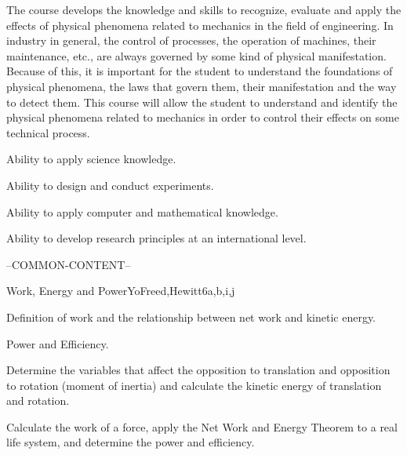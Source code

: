 \begin{syllabus}


\begin{justification}
   The course develops the knowledge and skills to recognize, evaluate and apply the effects of physical phenomena related to mechanics in the field of engineering. In industry in general, the control of processes, the operation of machines, their maintenance, etc., are always governed by some kind of physical manifestation. Because of this, it is important for the student to understand the foundations of physical phenomena, the laws that govern them, their manifestation and the way to detect them. This course will allow the student to understand and identify the physical phenomena related to mechanics in order to control their effects on some technical process. 
\end{justification}

\begin{goals}
\item Ability to apply science knowledge.
\item Ability to design and conduct experiments.
\item Ability to apply computer and mathematical knowledge.
\item Ability to develop research principles at an international level.
\end{goals}

--COMMON-CONTENT--

\begin{unit}{Work, Energy and Power}{}{YoFreed,Hewitt}{6}{a,b,i,j}
   \begin{topics}
      \item Definition of work and the relationship between net work and kinetic energy.
      \item Power and Efficiency.
   \end{topics}
   
   \begin{learningoutcomes}
      \item Determine the variables that affect the opposition to translation and opposition to rotation (moment of inertia) and calculate the kinetic energy of translation and rotation.
      \item Calculate the work of a force, apply the Net Work and Energy Theorem to a real life system, and determine the power and efficiency.
   \end{learningoutcomes}
\end{unit}
   

\end{syllabus}
